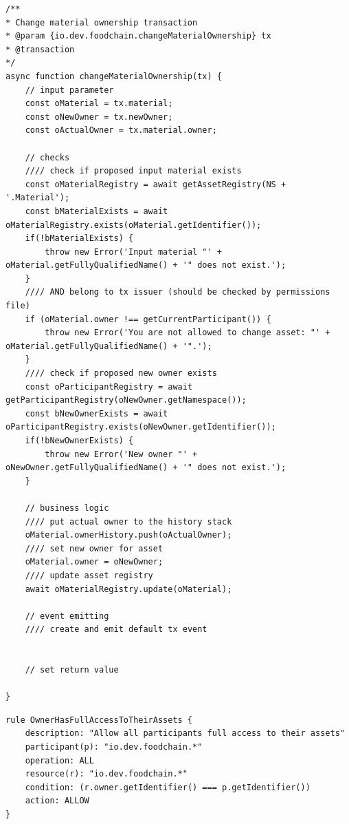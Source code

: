 \begin{lstlisting}[caption={Transaction Processor Function \textit{changeMaterialOwnership(tx)}},language=ES6,label=lst:transaction-logic-change-ownership]
/**
* Change material ownership transaction
* @param {io.dev.foodchain.changeMaterialOwnership} tx
* @transaction
*/
async function changeMaterialOwnership(tx) {
    // input parameter
    const oMaterial = tx.material;
    const oNewOwner = tx.newOwner;
    const oActualOwner = tx.material.owner;

    // checks
    //// check if proposed input material exists
    const oMaterialRegistry = await getAssetRegistry(NS + '.Material');
    const bMaterialExists = await oMaterialRegistry.exists(oMaterial.getIdentifier());
    if(!bMaterialExists) {
        throw new Error('Input material "' + oMaterial.getFullyQualifiedName() + '" does not exist.');
    }
    //// AND belong to tx issuer (should be checked by permissions file)
    if (oMaterial.owner !== getCurrentParticipant()) {
        throw new Error('You are not allowed to change asset: "' + oMaterial.getFullyQualifiedName() + '".');
    }
    //// check if proposed new owner exists
    const oParticipantRegistry = await getParticipantRegistry(oNewOwner.getNamespace());
    const bNewOwnerExists = await oParticipantRegistry.exists(oNewOwner.getIdentifier());
    if(!bNewOwnerExists) {
        throw new Error('New owner "' + oNewOwner.getFullyQualifiedName() + '" does not exist.');
    }

    // business logic
    //// put actual owner to the history stack
    oMaterial.ownerHistory.push(oActualOwner);
    //// set new owner for asset
    oMaterial.owner = oNewOwner;
    //// update asset registry
    await oMaterialRegistry.update(oMaterial);

    // event emitting
    //// create and emit default tx event


    // set return value

}
\end{lstlisting}


\begin{lstlisting}[caption={Berechtigungsdefinition},label=lst:model-permissions]
rule OwnerHasFullAccessToTheirAssets {
    description: "Allow all participants full access to their assets"
    participant(p): "io.dev.foodchain.*"
    operation: ALL
    resource(r): "io.dev.foodchain.*"
    condition: (r.owner.getIdentifier() === p.getIdentifier())
    action: ALLOW
}
\end{lstlisting}

